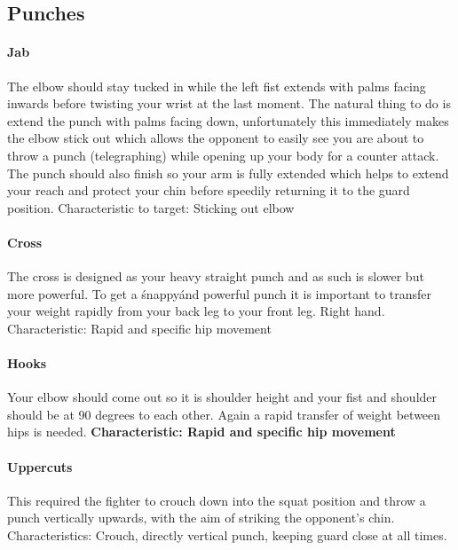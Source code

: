 \subsection{Punches}
\label{subsec:subsec03}
\paragraph{Jab}
The elbow should stay tucked in while the left fist extends with palms facing inwards before twisting your wrist at the last moment. The natural thing to do is extend the punch with palms facing down, unfortunately this immediately makes the elbow stick out which allows the opponent to easily see you are about to throw a punch (telegraphing) while opening up your body for a counter attack.
The punch should also finish so your arm is fully extended which helps to extend your reach and protect your chin before speedily returning it to the guard position.
Characteristic to target: Sticking out elbow

\paragraph{Cross}
The cross is designed as your heavy straight punch and as such is slower but more powerful. To get a \'snappy\' and powerful punch it is important to transfer your weight rapidly from your back leg to your front leg. Right hand. Characteristic: Rapid and specific hip movement

\paragraph{Hooks}
Your elbow should come out so it is shoulder height and your fist and shoulder should be at 90 degrees to each other. Again a rapid transfer of weight between hips is needed. {\bf Characteristic: Rapid and specific hip movement}

\paragraph{Uppercuts}
This required the fighter to crouch down into the squat position and throw a punch vertically upwards, with the aim of striking the opponent's chin.
Characteristics: Crouch, directly vertical punch, keeping guard close at all times.\cite{Rector2013}


